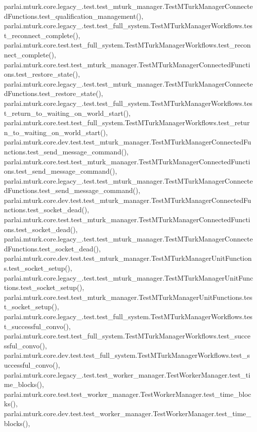 parlai.\+mturk.\+core.\+legacy\+\_.\+test.\+test\+\_\+mturk\+\_\+manager.\+Test\+M\+Turk\+Manager\+Connected\+Functions.\+test\+\_\+qualification\+\_\+management(), parlai.\+mturk.\+core.\+legacy\+\_.\+test.\+test\+\_\+full\+\_\+system.\+Test\+M\+Turk\+Manager\+Workflows.\+test\+\_\+reconnect\+\_\+complete(), parlai.\+mturk.\+core.\+test.\+test\+\_\+full\+\_\+system.\+Test\+M\+Turk\+Manager\+Workflows.\+test\+\_\+reconnect\+\_\+complete(), parlai.\+mturk.\+core.\+test.\+test\+\_\+mturk\+\_\+manager.\+Test\+M\+Turk\+Manager\+Connected\+Functions.\+test\+\_\+restore\+\_\+state(), parlai.\+mturk.\+core.\+legacy\+\_.\+test.\+test\+\_\+mturk\+\_\+manager.\+Test\+M\+Turk\+Manager\+Connected\+Functions.\+test\+\_\+restore\+\_\+state(), parlai.\+mturk.\+core.\+legacy\+\_.\+test.\+test\+\_\+full\+\_\+system.\+Test\+M\+Turk\+Manager\+Workflows.\+test\+\_\+return\+\_\+to\+\_\+waiting\+\_\+on\+\_\+world\+\_\+start(), parlai.\+mturk.\+core.\+test.\+test\+\_\+full\+\_\+system.\+Test\+M\+Turk\+Manager\+Workflows.\+test\+\_\+return\+\_\+to\+\_\+waiting\+\_\+on\+\_\+world\+\_\+start(), parlai.\+mturk.\+core.\+dev.\+test.\+test\+\_\+mturk\+\_\+manager.\+Test\+M\+Turk\+Manager\+Connected\+Functions.\+test\+\_\+send\+\_\+message\+\_\+command(), parlai.\+mturk.\+core.\+test.\+test\+\_\+mturk\+\_\+manager.\+Test\+M\+Turk\+Manager\+Connected\+Functions.\+test\+\_\+send\+\_\+message\+\_\+command(), parlai.\+mturk.\+core.\+legacy\+\_.\+test.\+test\+\_\+mturk\+\_\+manager.\+Test\+M\+Turk\+Manager\+Connected\+Functions.\+test\+\_\+send\+\_\+message\+\_\+command(), parlai.\+mturk.\+core.\+dev.\+test.\+test\+\_\+mturk\+\_\+manager.\+Test\+M\+Turk\+Manager\+Connected\+Functions.\+test\+\_\+socket\+\_\+dead(), parlai.\+mturk.\+core.\+test.\+test\+\_\+mturk\+\_\+manager.\+Test\+M\+Turk\+Manager\+Connected\+Functions.\+test\+\_\+socket\+\_\+dead(), parlai.\+mturk.\+core.\+legacy\+\_.\+test.\+test\+\_\+mturk\+\_\+manager.\+Test\+M\+Turk\+Manager\+Connected\+Functions.\+test\+\_\+socket\+\_\+dead(), parlai.\+mturk.\+core.\+dev.\+test.\+test\+\_\+mturk\+\_\+manager.\+Test\+M\+Turk\+Manager\+Unit\+Functions.\+test\+\_\+socket\+\_\+setup(), parlai.\+mturk.\+core.\+legacy\+\_.\+test.\+test\+\_\+mturk\+\_\+manager.\+Test\+M\+Turk\+Manager\+Unit\+Functions.\+test\+\_\+socket\+\_\+setup(), parlai.\+mturk.\+core.\+test.\+test\+\_\+mturk\+\_\+manager.\+Test\+M\+Turk\+Manager\+Unit\+Functions.\+test\+\_\+socket\+\_\+setup(), parlai.\+mturk.\+core.\+legacy\+\_.\+test.\+test\+\_\+full\+\_\+system.\+Test\+M\+Turk\+Manager\+Workflows.\+test\+\_\+successful\+\_\+convo(), parlai.\+mturk.\+core.\+test.\+test\+\_\+full\+\_\+system.\+Test\+M\+Turk\+Manager\+Workflows.\+test\+\_\+successful\+\_\+convo(), parlai.\+mturk.\+core.\+dev.\+test.\+test\+\_\+full\+\_\+system.\+Test\+M\+Turk\+Manager\+Workflows.\+test\+\_\+successful\+\_\+convo(), parlai.\+mturk.\+core.\+legacy\+\_.\+test.\+test\+\_\+worker\+\_\+manager.\+Test\+Worker\+Manager.\+test\+\_\+time\+\_\+blocks(), parlai.\+mturk.\+core.\+test.\+test\+\_\+worker\+\_\+manager.\+Test\+Worker\+Manager.\+test\+\_\+time\+\_\+blocks(), parlai.\+mturk.\+core.\+dev.\+test.\+test\+\_\+worker\+\_\+manager.\+Test\+Worker\+Manager.\+test\+\_\+time\+\_\+blocks(), 